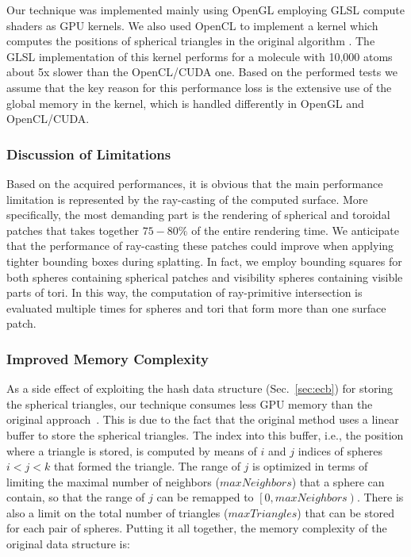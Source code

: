 Our technique was implemented mainly using OpenGL employing GLSL compute shaders as GPU kernels.
We also used OpenCL to implement a kernel which computes the positions of spherical triangles in the original algorithm \cite{krone2011parallel}.
The GLSL implementation of this kernel performs for a molecule with {\tweakedsim}10,000 atoms about 5x slower than the OpenCL/CUDA one.
Based on the performed tests we assume that the key reason for this performance loss is the extensive use of the global memory in the kernel, which is handled differently in OpenGL and OpenCL/CUDA.

\subsubsection{Discussion of Limitations}
Based on the acquired performances, it is obvious that the main performance limitation is represented by the ray-casting of the computed surface.
More specifically, the most demanding part is the rendering of spherical and toroidal patches that takes together $75-80\%$ of the entire rendering time.
We anticipate that the performance of ray-casting these patches could improve when applying tighter bounding boxes during splatting.
In fact, we employ bounding squares for both spheres containing spherical patches and visibility spheres containing visible parts of tori.
In this way, the computation of ray-primitive intersection is evaluated multiple times for spheres and tori that form more than one surface patch.

\subsubsection{Improved Memory Complexity}

As a side effect of exploiting the hash data structure (Sec.~\ref{sec:ecb}) for storing the spherical triangles, our technique consumes less GPU memory than the original approach~\cite{krone2011parallel}.
This is due to the fact that the original method uses a linear buffer to store the spherical triangles.
The index into this buffer, i.e., the position where a triangle is stored, is computed by means of $i$ and $j$ indices of spheres $i < j < k$ that formed the triangle.
The range of $j$ is optimized in terms of limiting the maximal number of neighbors ($maxNeighbors$) that a sphere can contain, so that the range of $j$ can be remapped to $\left[0, maxNeighbors\right)$.
There is also a limit on the total number of triangles ($maxTriangles$) that can be stored for each pair of spheres.
Putting it all together, the memory complexity of the original data structure is:

